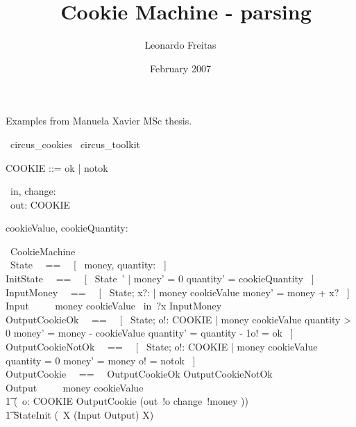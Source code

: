 \documentclass{article}
\begin{document}
\title{\Circus\ Cookie Machine - parsing}
\author{Leonardo Freitas}
\date{February 2007}

\maketitle

Examples from Manuela Xavier MSc thesis.

\begin{zsection}
  \SECTION\ circus\_cookies \parents\ circus\_toolkit
\end{zsection}

\begin{zed}
   COOKIE ::= ok | notok
\end{zed}

\begin{circus}
   \circchannel\ in, change: \nat \\
   \circchannel\ out: COOKIE
\end{circus}

\begin{axdef}
   cookieValue, cookieQuantity: \nat
\end{axdef}

\begin{circus}
    \circprocess\ CookieMachine \circdef \circbegin \\
    \circstate\ State ~~==~~ [~ money, quantity: \nat ~]  \\
    InitState ~~==~~ [~ State~' | money' = 0 \land quantity' = cookieQuantity ~] \\
    InputMoney ~~==~~ [~ \Delta State; x?: \nat | money \leq cookieValue \land money' = money + x? ~] \\
    Input ~~\circdef~~ \lcircguard money \leq cookieValue \rcircguard  \circguard\ in~?x \then InputMoney \\
    OutputCookieOk ~~==~~ [~ \Delta State; o!: COOKIE | money \geq cookieValue \land
        quantity > 0 \land money' = money - cookieValue \land quantity' = quantity - 1\land o! = ok ~] \\
    OutputCookieNotOk ~~==~~ [~ \Delta State; o!: COOKIE | money \geq cookieValue \land
        quantity = 0 \land money' = money \land o! = notok ~] \\
    OutputCookie ~~==~~ OutputCookieOk \lor OutputCookieNotOk \\
    Output ~~\circdef~~ \lcircguard money \geq cookieValue \rcircguard \circguard\ \\
        \t1 (\circvar\ o: COOKIE \circspot OutputCookie \circseq (out~!o \then change~!money \then \Skip)) \\
    \t1 \circspot StateInit \circseq (\circmu\ X \circspot (Input \extchoice Output) \circseq X) \\
   \circend
\end{circus}
\end{document}
